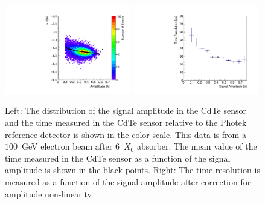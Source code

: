 \begin{figure}[htbp] 
\centering
\includegraphics[width=0.49\textwidth]{figures/100GeV_deltaTVsAmp.pdf} 
\includegraphics[width=0.49\textwidth]{figures/TimeResolutionVsAmplitude.pdf} 
\caption{ Left: The distribution of the signal amplitude in the CdTe sensor and 
the time measured in the CdTe sensor relative to the Photek reference detector
is shown in the color scale. This data is from a $100$~GeV electron beam after $6$~$X_0$ absorber.
The mean value of the time measured in the CdTe sensor 
as a function of the signal amplitude is shown in the black points. 
Right: The time resolution is measured as a function of the signal amplitude after correction
for amplitude non-linearity. } 
\label{fig:DeltaTVsAmplitude} 
\end{figure} 


